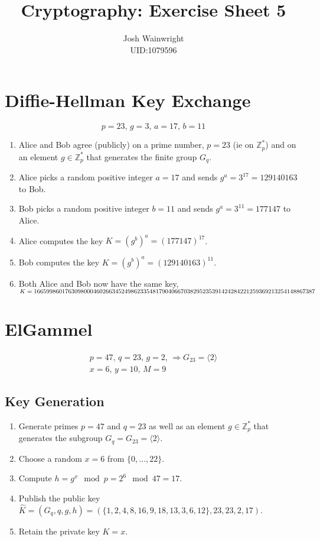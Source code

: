 \documentclass[11pt]{article} %
\author{Josh Wainwright \\ UID:1079596}
\title{Cryptography: Exercise Sheet 5 }
\date{}
\begin{document}
\maketitle

\section{Diffie-Hellman Key Exchange}
\begin{equation}
	p=23,\, g=3,\, a=17,\, b=11
\end{equation}
\begin{enumerate}
	\item Alice and Bob agree (publicly) on a prime number, $p=23$ (ie on
		$\mathbb{Z}^{*}_{p}$) and on an element $g \in \mathbb{Z}^{*}_{p}$ that
		generates the finite group  $G_q$.
	\item Alice picks a random positive integer $a=17$ and sends $g^a = 3^{17}
		= 129140163$ to Bob.
	\item Bob picks a random positive integer $b=11$ and sends $g^a = 3^{11} =
		177147$ to Alice.
	\item Alice computes the key $K = {(g^b)}^a = {(177147)}^{17}$.
	\item Bob computes the key $K = {(g^b)}^a = {(129140163)}^{11}$.
	\item Both Alice and Bob now have the same key, $K =
		1\-6\-6\-5\-9\-9\-8\-6\-0\-1\-7\-6\-3\-0\-9\-8\-0\-0\-0\-4\-6\-0\-2\-6\-6\-3\-4\-5\-2\-4\-9\-8\-6\-2\-3\-3\-5\-4\-8\-1\-7\-9\-0\-4\-0\-6\-6\-7\-0\-3\-8\-2\-9\-5\-2\-3\-5\-3\-9\-1\-4\-2\-4\-2\-8\-4\-2\-2\-1\-2\-5\-9\-3\-6\-9\-2\-1\-3\-2\-5\-4\-1\-4\-8\-8\-6\-7\-3\-8\-7$
\end{enumerate}

\section{ElGammel}
\begin{align}
	p=47,\, q=23,\, g=2,\, \Rightarrow G_{23} = \langle 2 \rangle \\
	x=6,\, y=10,\, M=9
\end{align}
\subsection{Key Generation}
\begin{enumerate}
	\item Generate primes $p=47$ and $q=23$ as well as an element $g \in
		\mathbb{Z}^{*}_{p}$ that generates the subgroup $G_{q} = G_{23} =
		\langle 2 \rangle$.
	\item Choose a random $x=6$ from $\{0, \ldots, 22\}$.
	\item Compute $h=g^x \mod p = 2^6 \mod 47 = 17$.
	\item Publish the public key $\hat{K} = (G_q, q, g, h) =
		(\{1,2,4,8,16,9,18, 13, 3, 6, 12\}, 23, 23, 2, 17)$.
	\item Retain the private key $K=x$.
\end{enumerate}
\end{document}

